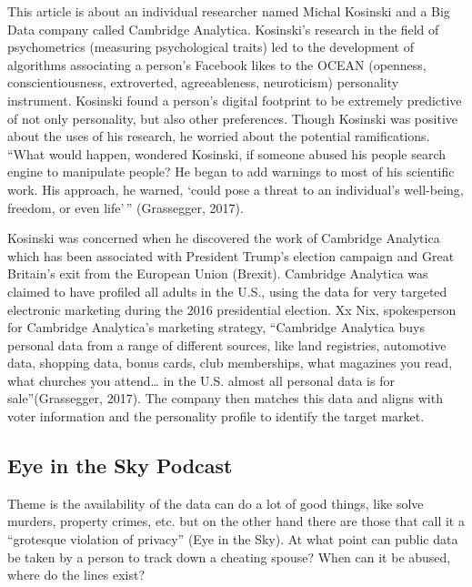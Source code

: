 \documentclass[]{book}
\theoremstyle{definition}
\theoremstyle{definition}
\theoremstyle{definition}
\theoremstyle{remark}
\begin{document}
This article is about an individual researcher named Michal Kosinski and
a Big Data company called Cambridge Analytica. Kosinski's research in
the field of psychometrics (measuring psychological traits) led to the
development of algorithms associating a person's Facebook likes to the
OCEAN (openness, conscientiousness, extroverted, agreeableness,
neuroticism) personality instrument. Kosinski found a person's digital
footprint to be extremely predictive of not only personality, but also
other preferences. Though Kosinski was positive about the uses of his
research, he worried about the potential ramifications. ``What would
happen, wondered Kosinski, if someone abused his people search engine to
manipulate people? He began to add warnings to most of his scientific
work. His approach, he warned, `could pose a threat to an individual's
well-being, freedom, or even life'\,'' (Grassegger, 2017).

Kosinski was concerned when he discovered the work of Cambridge
Analytica which has been associated with President Trump's election
campaign and Great Britain's exit from the European Union (Brexit).
Cambridge Analytica was claimed to have profiled all adults in the U.S.,
using the data for very targeted electronic marketing during the 2016
presidential election. Xx Nix, spokesperson for Cambridge Analytica's
marketing strategy, ``Cambridge Analytica buys personal data from a
range of different sources, like land registries, automotive data,
shopping data, bonus cards, club memberships, what magazines you read,
what churches you attend\ldots{} in the U.S. almost all personal data is
for sale''(Grassegger, 2017). The company then matches this data and
aligns with voter information and the personality profile to identify
the target market.

\hypertarget{eye-in-the-sky-podcast}{%
\subsection{Eye in the Sky Podcast}\label{eye-in-the-sky-podcast}}

Theme is the availability of the data can do a lot of good things, like
solve murders, property crimes, etc. but on the other hand there are
those that call it a ``grotesque violation of privacy'' (Eye in the
Sky). At what point can public data be taken by a person to track down a
cheating spouse? When can it be abused, where do the lines exist?
\end{document}
